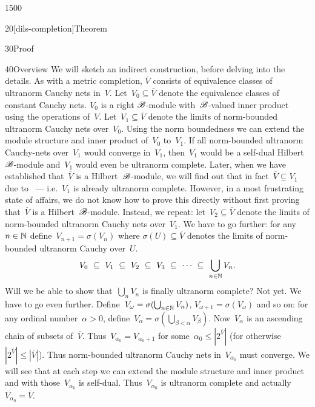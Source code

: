 \begin{parsec}{1500}
\begin{point}{20}[dils-completion]{Theorem}
\begin{point}{30}{Proof}
\begin{point}{40}{Overview}
We will sketch an indirect construction,
    before delving into the details.
As with a metric completion,
    $\overline{V}$ consists of equivalence classes of ultranorm
        Cauchy nets in~$V$.
Let~$V_0\subseteq \overline{V}$
    denote the equivalence classes of constant Cauchy nets.
$V_0$ is a right $\mathscr{B}$-module with~$\mathscr{B}$-valued inner product
    using the operations of~$V$.
Let~$V_1\subseteq \overline{V}$ denote
    the limits of norm-bounded ultranorm Cauchy nets over~$V_0$.
Using the norm boundedness we can extend
    the module structure and inner product of~$V_0$ to~$V_1$.
If all norm-bounded ultranorm Cauchy-nets over~$V_1$ would
    converge in~$V_1$,
    then~$V_1$ would be a self-dual Hilbert~$\mathscr{B}$-module
    and~$V_1$ would even be ultranorm complete.
Later, when we have established that~$\overline{V}$ is a Hilbert~$\mathscr{B}$-module,
    we will find out that in fact~$\overline{V} \subseteq V_1$
    due to~
    ---
    i.e.~$V_1$ is already ultranorm complete.
However, in a most frustrating state of affairs,
    we do not know how to prove this directly
    without first proving that~$\overline{V}$ is a Hilbert~$\mathscr{B}$-module.
Instead, we repeat: let~$V_2 \subseteq \overline{V}$
    denote the limits of norm-bounded ultranorm Cauchy nets over~$V_1$.
We have to go further:
    for any~$n \in \mathbb{N}$
    define~$V_{n+1} = \sigma(V_n)$
    where $\sigma(U)\subseteq \overline{V}$
    denotes the limits of norm-bounded ultranorm Cauchy over~$U$.
\begin{equation*}
   V_0 \ \subseteq \ V_1 \ \subseteq\  V_2\  \subseteq\  V_3 \ \subseteq \ \cdots\ \subseteq \ \bigcup_{n \in \N} V_n.
\end{equation*}
Will we be able to show that~$\bigcup_n V_n$ is finally ultranorm complete?
Not yet.
We have to go even further.
Define~$V_\omega = \sigma(\bigcup_{n \in \mathbb{N}} V_n)$,
$V_{\omega+1} = \sigma(V_\omega)$
and so on:
for any ordinal number~$\alpha > 0$,
    define~$V_\alpha = \sigma(\bigcup_{\beta < \alpha} V_\beta)$.
Now~$V_\alpha$
    is an ascending chain of subsets of~$\overline{V}$.
    Thus~$V_{\alpha_0} = V_{{\alpha_0}+1}$
for some~$\alpha_0 \leq |2^{\overline{V}}|$
(for otherwise~$|2^{\overline{V}}| \leq |\overline{V}|$).
Thus norm-bounded ultranorm Cauchy nets in~$V_{\alpha_0}$
    must converge.
We will see that at each step we can extend the module structure
    and inner product and with those~$V_{\alpha_0}$ is self-dual.
    Thus~$V_{\alpha_0}$ is ultranorm complete
    and actually~$V_{\alpha_0} = \overline{V}$.
\begin{equation*}

\end{equation*}
\end{point}
\end{point}
\end{point}
\end{parsec}
